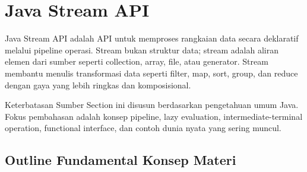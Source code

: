 \section{Java Stream API}

Java Stream API adalah API untuk memproses rangkaian data secara deklaratif melalui pipeline operasi. Stream bukan struktur data; stream adalah aliran elemen dari sumber seperti collection, array, file, atau generator. Stream membantu menulis transformasi data seperti filter, map, sort, group, dan reduce dengan gaya yang lebih ringkas dan komposisional.

\begin{cmt}{Keterbatasan Sumber}{}
Section ini disusun berdasarkan pengetahuan umum Java. Fokus pembahasan adalah konsep pipeline, lazy evaluation, intermediate-terminal operation, functional interface, dan contoh dunia nyata yang sering muncul.
\end{cmt}

\subsection{Outline Fundamental Konsep Materi}

